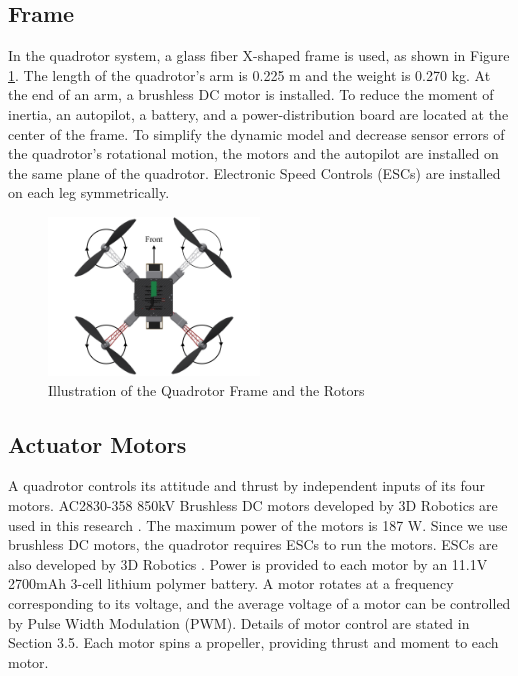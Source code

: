 \subsection{Frame}

In the quadrotor system, a glass fiber X-shaped frame is used, as shown in Figure \ref{fig:geometry}. The length of the quadrotor's arm is 0.225 m and the weight is 0.270 kg. At the end of an arm, a brushless DC motor is installed. To reduce the moment of inertia, an autopilot, a battery, and a power-distribution board are located at the center of the frame. To simplify the dynamic model and decrease sensor errors of the quadrotor's rotational motion, the motors and the autopilot are installed on the same plane of the quadrotor. Electronic Speed Controls (ESCs) are installed on each leg symmetrically. 

\begin{figure}
    \centering
    \includegraphics[width=0.5\textwidth]{graphics/geometry.pdf}
    \caption{Illustration of the Quadrotor Frame and the Rotors}
    \label{fig:geometry}
\end{figure}

\subsection{Actuator Motors} 

A quadrotor controls its attitude and thrust by independent inputs of its four motors. AC2830-358 850kV Brushless DC motors developed by 3D Robotics are used in this research \cite{motor}. The maximum power of the motors is 187 W. Since we use brushless DC motors, the quadrotor requires ESCs to run the motors. ESCs are also developed by 3D Robotics \cite{esc}. Power is provided to each motor by an 11.1V 2700mAh 3-cell lithium polymer battery. A motor rotates at a frequency corresponding to its voltage, and the average voltage of a motor can be controlled by Pulse Width Modulation (PWM). Details of motor control are stated in Section 3.5. Each motor spins a propeller, providing thrust and moment to each motor.

